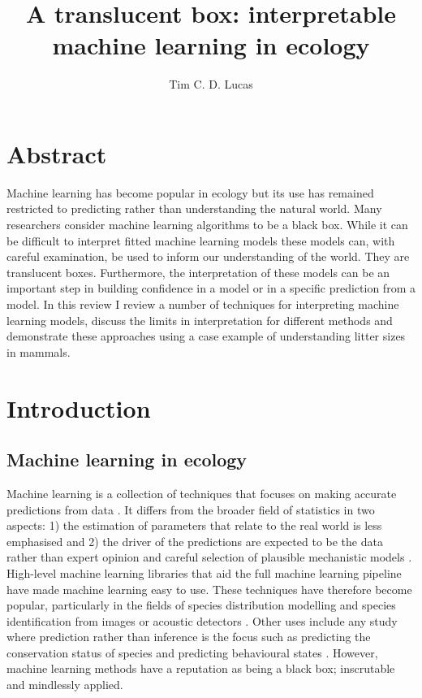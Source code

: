 \documentclass[10pt,]{article}
\title{A translucent box: interpretable machine learning in ecology}
\author{Tim C. D. Lucas}
\date{}
\begin{document}
\maketitle

\section{Abstract}\label{abstract}

Machine learning has become popular in ecology but its use has remained restricted to predicting rather than understanding the natural world.
Many researchers consider machine learning algorithms to be a black box.
While it can be difficult to interpret fitted machine learning models these models can, with careful examination, be used to inform our understanding of the world.
They are translucent boxes.
Furthermore, the interpretation of these models can be an important step in building confidence in a model or in a specific prediction from a model.
In this review I review a number of techniques for interpreting machine learning models, discuss the limits in interpretation for different methods and demonstrate these approaches using a case example of understanding litter sizes in mammals.


\section{Introduction}\label{introduction}

\subsection{Machine learning in ecology}\label{machine-learning-in-ecology}

Machine learning is a collection of techniques that focuses on making accurate predictions from data \citep{crisci2012review, breiman2001statistical}. 
It differs from the broader field of statistics in two aspects: 1) the estimation of parameters that relate to the real world is less emphasised and 2) the driver of the predictions are expected to be the data rather than expert opinion and careful selection of plausible mechanistic models \citep{breiman2001statistical}. 
High-level machine learning libraries that aid the full machine learning pipeline \citep{caret, scikit, maxent, biomod} have made machine learning easy to use. 
These techniques have therefore become popular, particularly in the fields of species distribution modelling \citep{maxent, biomod, elith2006novel, golding2018zoon, gobeyn2019evolutionary} and species identification from images or acoustic detectors \citep{mac2018bat, waldchen2018machine, shamir2014classification, xue2017automatic}. 
Other uses include any study where prediction rather than inference is the focus such as predicting the conservation status of species \citep{bland2015predicting} and predicting behavioural states \citep{browning2018predicting}. 
However, machine learning methods have a reputation as being a black box; inscrutable and mindlessly applied.
\end{document}
